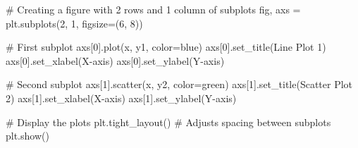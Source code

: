 \documentclass[
  letterpaper,
  DIV=11,
  numbers=noendperiod]{scrreprt}
\newenvironment{Shaded}{\begin{snugshade}}{\end{snugshade}}
\newcommand{\CommentTok}[1]{\textcolor[rgb]{0.37,0.37,0.37}{#1}}
\newcommand{\DecValTok}[1]{\textcolor[rgb]{0.68,0.00,0.00}{#1}}
\newcommand{\NormalTok}[1]{\textcolor[rgb]{0.00,0.23,0.31}{#1}}
\newcommand{\OperatorTok}[1]{\textcolor[rgb]{0.37,0.37,0.37}{#1}}
\newcommand{\StringTok}[1]{\textcolor[rgb]{0.13,0.47,0.30}{#1}}
\begin{document}
\begin{Shaded}
\begin{Highlighting}[]
\CommentTok{\# Creating a figure with 2 rows and 1 column of subplots}
\NormalTok{fig, axs }\OperatorTok{=}\NormalTok{ plt.subplots(}\DecValTok{2}\NormalTok{, }\DecValTok{1}\NormalTok{, figsize}\OperatorTok{=}\NormalTok{(}\DecValTok{6}\NormalTok{, }\DecValTok{8}\NormalTok{))}

\CommentTok{\# First subplot}
\NormalTok{axs[}\DecValTok{0}\NormalTok{].plot(x, y1, color}\OperatorTok{=}\StringTok{\textquotesingle{}blue\textquotesingle{}}\NormalTok{)}
\NormalTok{axs[}\DecValTok{0}\NormalTok{].set\_title(}\StringTok{\textquotesingle{}Line Plot 1\textquotesingle{}}\NormalTok{)}
\NormalTok{axs[}\DecValTok{0}\NormalTok{].set\_xlabel(}\StringTok{\textquotesingle{}X{-}axis\textquotesingle{}}\NormalTok{)}
\NormalTok{axs[}\DecValTok{0}\NormalTok{].set\_ylabel(}\StringTok{\textquotesingle{}Y{-}axis\textquotesingle{}}\NormalTok{)}

\CommentTok{\# Second subplot}
\NormalTok{axs[}\DecValTok{1}\NormalTok{].scatter(x, y2, color}\OperatorTok{=}\StringTok{\textquotesingle{}green\textquotesingle{}}\NormalTok{)}
\NormalTok{axs[}\DecValTok{1}\NormalTok{].set\_title(}\StringTok{\textquotesingle{}Scatter Plot 2\textquotesingle{}}\NormalTok{)}
\NormalTok{axs[}\DecValTok{1}\NormalTok{].set\_xlabel(}\StringTok{\textquotesingle{}X{-}axis\textquotesingle{}}\NormalTok{)}
\NormalTok{axs[}\DecValTok{1}\NormalTok{].set\_ylabel(}\StringTok{\textquotesingle{}Y{-}axis\textquotesingle{}}\NormalTok{)}

\CommentTok{\# Display the plots}
\NormalTok{plt.tight\_layout()  }\CommentTok{\# Adjusts spacing between subplots}
\NormalTok{plt.show()}
\end{Highlighting}
\end{Shaded}
\end{document}
